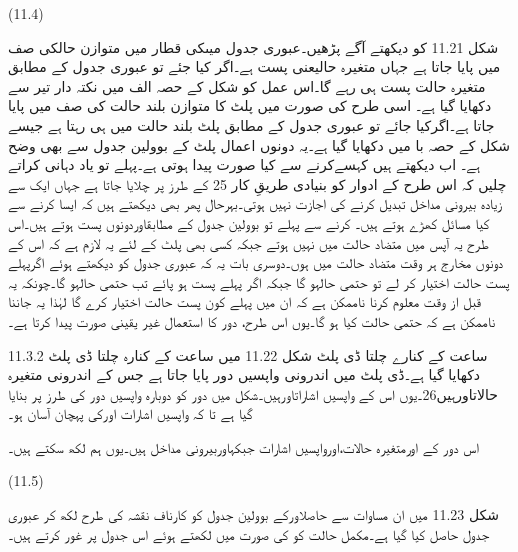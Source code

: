  
(11.4)
 
	شکل 11.21 کو دیکھتے آگے پڑھیں۔عبوری جدول میںکی قطار میں متوازن حالکی صف میں پایا جاتا ہے جہاں متغیرہ حالیعنی پست ہے۔اگر کیا جئے تو عبوری جدول کے مطابق متغیرہ حالت پست ہی رہے گا۔اس عمل کو شکل کے حصہ الف میں نکتہ دار تیر سے دکھایا گیا ہے۔
	اسی طرح  کی صورت میں پلٹ کا متوازن بلند حالت  کی صف میں پایا جاتا ہے۔اگرکیا جائے تو عبوری جدول کے مطابق پلٹ بلند حالت میں ہی رہتا ہے جیسے شکل کے حصہ با میں دکھایا گیا ہے۔یہ دونوں اعمال پلٹ کے بوولین جدول سے بھی وضح ہے۔
	اب دیکھتے ہیں کہسےکرنے سے کیا صورت پیدا ہوتی ہے۔پہلے تو یاد دہانی کراتے چلیں کہ اس طرح کے ادوار کو بنیادی طریقِ کار 25 کے طرز پر چلایا جاتا ہے جہاں ایک سے زیادہ بیرونی مداخل تبدیل کرنے کی اجازت نہیں ہوتی۔بہرحال پھر بھی دیکھتے ہیں کہ ایسا کرنے سے کیا مسائل کھڑے ہوتے ہیں۔
	کرنے سے پہلے تو بوولین جدول کے مطابقاوردونوں پست ہوتے ہیں۔اس طرح یہ آپس میں متضاد حالت میں نہیں ہوتے جبکہ کسی بھی پلٹ کے لئے یہ لازم ہے کہ اس کے دونوں مخارج ہر وقت متضاد حالت میں ہوں۔دوسری بات یہ کہ عبوری جدول کو دیکھتے ہوئے اگرپہلے پست حالت اختیار کر لے تو حتمی حالہو گا جبکہ اگر پہلے پست ہو پائے تب حتمی حالہو گا۔چونکہ یہ قبل از وقت معلوم کرنا ناممکن ہے کہ ان میں پہلے کون پست حالت اختیار کرے گا لہٰذا یہ جاننا ناممکن ہے کہ حتمی حالت کیا ہو گا۔یوں اس طرح، دور کا استعمال غیر یقینی صورت پیدا کرتا ہے۔

11.3.2 ساعت کے کنارے چلتا ڈی پلٹ
	شکل 11.22 میں ساعت کے کنارہ چلتا ڈی پلٹ دکھایا گیا ہے۔ڈی پلٹ میں اندرونی واپسیں دور پایا جاتا ہے جس کے اندرونی متغیرہ حالاتاورہیں26۔یوں اس کے واپسیں اشاراتاورہیں۔شکل میں دور کو دوبارہ واپسیں دور کی طرز پر بنایا گیا ہے تا کہ واپسیں اشارات اورکی پہچان آسان ہو۔



	اس دور کے اورمتغیرہ حالات،اورواپسیں اشارات  جبکہاوربیرونی مداخل ہیں۔یوں ہم لکھ سکتے ہیں۔

 
(11.5)

	شکل 11.23 میں ان مساوات سے حاصلاورکے بوولین جدول  کو کارناف نقشہ کی طرح لکھ کر عبوری جدول حاصل کیا گیا ہے۔مکمل حالت کو کی صورت میں لکھتے ہوئے اس جدول پر غور کرتے ہیں۔


